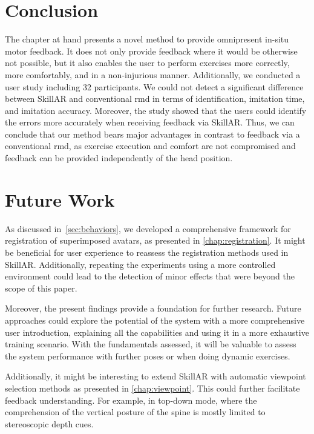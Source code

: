 \section{Conclusion}
The chapter at hand presents a novel method to provide omnipresent in-situ motor feedback. It does not only provide feedback where it would be otherwise not possible, but it also enables the user to perform exercises more correctly, more comfortably, and in a non-injurious manner. Additionally, we conducted a user study including 32 participants. We could not detect a significant difference between SkillAR and conventional \acrshort{rmd} in terms of identification, imitation time, and imitation accuracy. Moreover, the study showed that the users could identify the errors more accurately when receiving feedback via SkillAR. Thus, we can conclude that our method bears major advantages in contrast to feedback via a conventional \acrshort{rmd}, as exercise execution and comfort are not compromised and feedback can be provided independently of the head position.

\section{Future Work}
As discussed in~\autoref{sec:behaviors}, we developed a comprehensive framework for registration of superimposed avatars, as presented in \autoref{chap:registration}. It might be beneficial for user experience to reassess the registration methods used in SkillAR. Additionally, repeating the experiments using a more controlled environment could lead to the detection of minor effects that were beyond the scope of this paper.

Moreover, the present findings provide a foundation for further research. Future approaches could explore the potential of the system with a more comprehensive user introduction, explaining all the capabilities and using it in a more exhaustive training scenario. With the fundamentals assessed, it will be valuable to assess the system performance with further poses or when doing dynamic exercises.

Additionally, it might be interesting to extend SkillAR with automatic viewpoint selection methods as presented in \autoref{chap:viewpoint}. This could further facilitate feedback understanding. For example, in top-down mode, where the comprehension of the vertical posture of the spine is mostly limited to stereoscopic depth cues.
